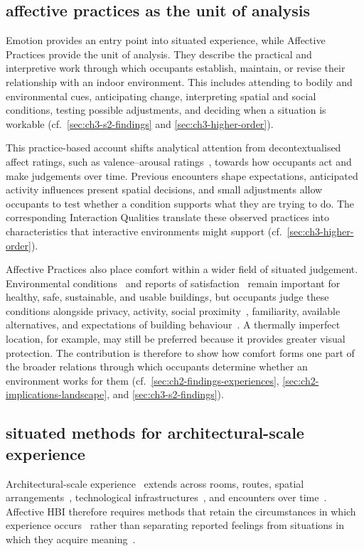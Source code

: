 \subsection{affective practices as the unit of analysis}
\label{subsec:affective-practices}

Emotion provides an entry point into situated experience, while Affective Practices provide the unit of analysis. They describe the practical and interpretive work through which occupants establish, maintain, or revise their relationship with an indoor environment. This includes attending to bodily and environmental cues, anticipating change, interpreting spatial and social conditions, testing possible adjustments, and deciding when a situation is workable (cf.~\autoref{sec:ch3-s2-findings} and \autoref{sec:ch3-higher-order}).

This practice-based account shifts analytical attention from decontextualised affect ratings, such as valence--arousal ratings~\cite{russell1980circumplex,rao2023affective, kuutti2014turn}, towards how occupants act and make judgements over time. Previous encounters shape expectations, anticipated activity influences present spatial decisions, and small adjustments allow occupants to test whether a condition supports what they are trying to do. The corresponding Interaction Qualities translate these observed practices into characteristics that interactive environments might support (cf.~\autoref{sec:ch3-higher-order}).

Affective Practices also place comfort within a wider field of situated judgement. Environmental conditions~\cite{jazizadeh2014human,marques2020real,van2010effect} and reports of satisfaction~\cite{zhang2012factors,alavi2017comfort} remain important for healthy, safe, sustainable, and usable buildings, but occupants judge these conditions alongside privacy, activity, social proximity~\cite{clear2018thermokiosk,von2021towards}, familiarity, available
alternatives, and expectations of building behaviour~\cite{mitchell2020human}. A thermally imperfect location, for example, may still be preferred because it provides greater visual protection. The contribution is therefore to show how comfort forms one part of the broader relations through which occupants determine whether an environment works for them (cf.~\autoref{sec:ch2-findings-experiences}, \autoref{sec:ch2-implications-landscape}, and \autoref{sec:ch3-s2-findings}).


\subsection{situated methods for architectural-scale experience}
\label{subsec:situated-methods}
Architectural-scale experience~\cite{alavi2019introduction,becerik2022field} extends across rooms, routes, spatial arrangements~\cite{alavi2018artifacts}, technological infrastructures~\cite{schnadelbach2019adaptive}, and encounters over time~\cite{turmo2025temporal}.  Affective HBI therefore requires methods that retain the circumstances in which experience occurs~\cite{dourish2001action,mccarthy2004technology} rather than separating reported feelings from situations in which they acquire meaning~\cite{boehner2007emotion,lottridge2011affective,ahmadpour2025affective}.

